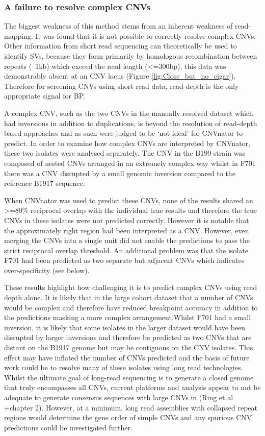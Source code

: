 \documentclass{article}
\begin{document}
\subsubsection{A failure to resolve complex CNVs}
The biggest weakness of this method stems from an inherent weakness of read-mapping. It was found that it is not possible to correctly resolve complex CNVs. Other information from short read sequencing can theoretically be used to identify SVs, because they form primarily by homologous recombination between repeats  (~1kb) which exceed the read length (<=300bp), this data was demonstrably absent at an CNV locus  (Figure \ref{fig:Close_but_no_cigar}). Therefore for screening CNVs using short read data, read-depth is the only appropriate signal for BP.

A complex CNV, such as the two CNVs in the manually resolved dataset which had inversions in addition to duplications, is beyond the resolution of read-depth based approaches and as such were judged to be `not-ideal' for CNVnator to predict. In order to examine how complex CNVs are interpreted by CNVnator, these two isolates were analysed separately. The CNV in the B199 strain was composed of nested CNVs arranged in an extremely complex way whilst in F701 there was a CNV disrupted by a small genomic inversion compared to the reference B1917 sequence. 


 When CNVnator was used to predict these CNVs, none of the results shared an >=80\% reciprocal overlap with the individual true results and therefore the true CNVs in these isolates were not predicted correctly. However it is notable that the approximately right region had been interpreted as a CNV. However, even merging the CNVs into a single unit did not enable the predictions to pass the strict reciprocal overlap threshold. An additional problem was that the isolate F701 had been predicted as two separate but adjacent CNVs which indicates over-specificity (see below).

These results highlight how challenging it is to predict complex CNVs using read depth alone. It is likely that in the large cohort dataset that a number of CNVs would be complex and therefore have reduced breakpoint accuracy in addition to the predictions masking a more complex arrangement.Whilst F701 had a small inversion, it is likely that some isolates in the larger dataset would have been disrupted by larger inversions and therefore be predicted as two CNVs that are distant on the B1917 genome but may be contiguous on the CNV isolates.  This effect may have inflated the number of CNVs predicted and the basis of future work could be to resolve many of these isolates using long read technologies. Whilst the ultimate goal of long-read sequencing is to generate a closed genome that truly encompasses all CNVs, current platforms and analysis appear to not be adequate to generate consensus sequences with large CNVs in (Ring et al +chapter 2). However, at a minimum, long read assemblies with collapsed repeat regions would determine the gene order of simple CNVs and any spurious CNV predictions could be investigated further.
\end{document}
